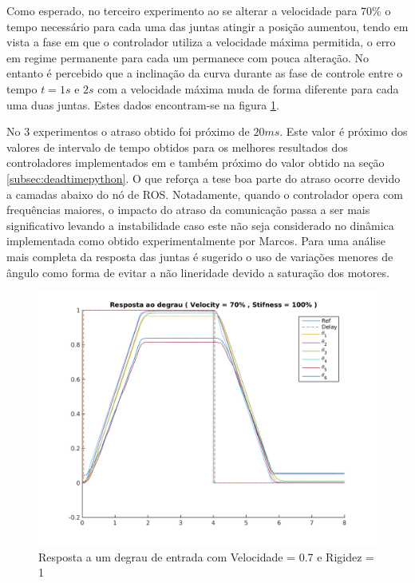 Como esperado, no terceiro experimento ao se alterar a velocidade para $70\%$ o tempo necessário para cada uma das juntas atingir a posição aumentou, tendo em vista a fase em que o controlador utiliza a velocidade máxima permitida, o erro em regime permanente para cada um permanece com pouca alteração. No entanto é percebido que a inclinação da curva durante as fase de controle entre o tempo $t=1s$ e $2s$ com a velocidade máxima muda de forma diferente para cada uma duas juntas. Estes dados encontram-se na figura \ref{fig:jointIdentification_exp3v70v100}.

No 3 experimentos o atraso obtido foi próximo de $20ms$. Este valor é próximo dos valores de intervalo de tempo obtidos para os melhores resultados dos controladores implementados em \cite{marcosps2016} e também próximo do valor obtido na seção \ref{subsec:deadtimepython}. O que reforça a tese boa parte do atraso ocorre devido a camadas abaixo do nó de ROS. Notadamente, quando o controlador opera com frequências maiores, o impacto do atraso da comunicação passa a ser mais significativo levando a instabilidade caso este não seja considerado no dinâmica implementada como obtido experimentalmente por Marcos. Para uma análise mais completa da resposta das juntas é sugerido o uso de variações menores de ângulo como forma de evitar a não lineridade devido a saturação dos motores.

\begin{figure}[H]
    \centering
    \includegraphics[width=0.8\linewidth]{tex/figs/jointIdentification_exp3v70v100.png}
    \caption{Resposta a um degrau de entrada com Velocidade = 0.7 e Rigidez = 1}
    \label{fig:jointIdentification_exp3v70v100}
\end{figure}


